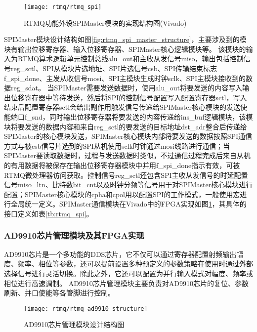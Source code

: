 \begin{figure}
    \centering
    \texttt{[image: rtmq/rtmq\_spi]}
    \caption[RTMQ功能外设SPIMaster模块的实现结构图]{RTMQ功能外设SPIMaster模块的实现结构图(Vivado)\label{fig:rtmq_spi}}
\end{figure}


SPIMaster模块设计结构如图\ref{fig:rtmq_spi_master_structure}，主要涉及到的模块有输出位移寄存器、输入位移寄存器、SPIMaster核心逻辑模块等。
该模块的输入为RTMQ算术逻辑单元控制总线alu\_out和主收从发信号miso，输出包括控制信号reg\_sctl、SPI从模块片选地址、SPI片选信号csb、SPI传输结束标志f\_spi\_done、主发从收信号mosi、SPI主模块生成时钟sclk、SPI主模块接收到的数据reg\_sdat。
当SPIMaster需要发送数据时，使用alu\_out将要发送的内容写入输出位移寄存器中等待发送，然后将SPI的控制信号配置写入配置寄存器sctl，写入结束后配置寄存器sctl会给出副作用触发信号传递给SPIMaster核心模块的发送使能端口f\_snd，同时输出位移寄存器将要发送的内容传递给ins\_buf逻辑模块，该模块将要发送的数据内容和来自reg\_sctl的要发送的目标地址dst\_adr整合后传递给SPIMaster的核心模块发送，SPIMaster核心模块内部将要发送的数据按照SPI通信方式与被csb信号片选到的SPI从机使用sclk时钟通过mosi线路进行通信；当SPIMaster要读取数据时，过程与发送数据时类似，不过通信过程完成后来自从机的有用数据将被保存在输出位移寄存器模块中并用f\_spi\_done指示有效，可被RTMQ微处理器访问获取。控制信号reg\_sctl还包含SPI主收从发信号的时延配置信号miso\_ltn、比特数bit\_cnt以及时钟分频等信号用于对SPIMaster核心模块进行配置；SPIMaster核心模块的cpha和cpol用以配置SPI的工作模式，一般使用宏进行全局统一定义。SPIMaster通信模块在Vivado中的FPGA实现如图\ref{fig:rtmq_spi}，其具体的接口定义如表\ref{tb:rtmq_spi}。




\subsubsection[AD9910芯片管理模块及其FPGA实现]{AD9910芯片管理模块及其FPGA实现}



AD9910芯片是一个多功能的DDS芯片，它不仅可以通过寄存器配置射频输出幅度、频率、相位等参数，还可以提前设置多种预定义的参数策略在使用时通过外部选择信号进行灵活切换。除此之外，它还可以配置为并行输入模式对幅度、频率或相位进行高速调制。
AD9910芯片管理模块主要负责对AD9910芯片的复位、参数刷新、并口使能等各管脚进行控制。

\begin{figure}
    \centering
    \texttt{[image: rtmq/rtmq\_ad9910\_structure]}
    \caption[AD9910芯片管理模块设计结构图]{AD9910芯片管理模块设计结构图\label{fig:rtmq_ad9910_structure}}
\end{figure}



